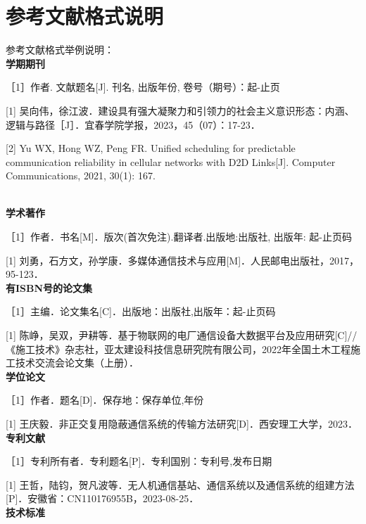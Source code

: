 \chapter{参考文献格式说明}\label{chap:refs}

\newlength{\oldparindent}
\setlength{\oldparindent}{\parindent}
\setlength{\parindent}{0pt}

参考文献格式举例说明：\\


\textbf{学期期刊}

［1］作者. 文献题名[J]. 刊名, 出版年份, 卷号（期号）：起-止页

{\color{red}
[1] 吴向伟，徐江波．建设具有强大凝聚力和引领力的社会主义意识形态：内涵、逻辑与路径［J］．宜春学院学报，2023，45（07）：17-23．

[2] Yu WX, Hong WZ, Peng FR. Unified scheduling for predictable communication reliability in cellular networks with D2D Links[J]. Computer Communications, 2021, 30(1): 167.
} \\


\textbf{学术著作}

［1］作者．书名[M]．版次(首次免注).翻译者.出版地:出版社, 出版年: 起-止页码

{\color{red}
[1] 刘勇，石方文，孙学康．多媒体通信技术与应用[M]．人民邮电出版社，2017，95-123．} \\

\textbf{有ISBN号的论文集}

［1］主编．论文集名[C]．出版地：出版社,出版年：起-止页码

{\color{red}
[1] 陈峥，吴双，尹耕等．基于物联网的电厂通信设备大数据平台及应用研究[C]//《施工技术》杂志社，亚太建设科技信息研究院有限公司，2022年全国土木工程施工技术交流会论文集（上册）．
} \\

\textbf{学位论文}

［1］作者．题名[D]．保存地：保存单位,年份

{\color{red}
[1] 王庆毅．非正交复用隐蔽通信系统的传输方法研究[D]．西安理工大学，2023．
} \\

\textbf{专利文献}

［1］专利所有者．专利题名[P]．专利国别：专利号,发布日期

{\color{red}
[1] 王哲，陆钧，贺凡波等．无人机通信基站、通信系统以及通信系统的组建方法[P]．安徽省：CN110176955B，2023-08-25．
} \\

\textbf{技术标准}

